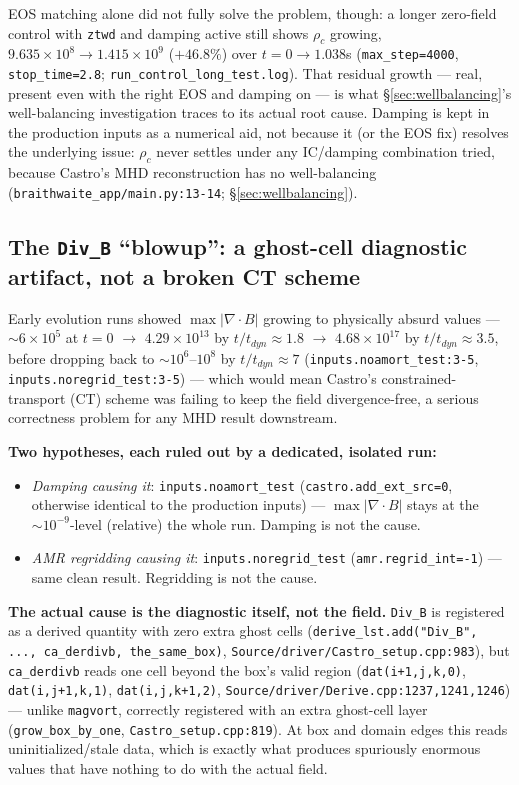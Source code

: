 \documentclass[11pt,a4paper]{scrartcl}
\newcommand{\code}[1]{\texttt{\small #1}}
\begin{document}
EOS matching alone did not fully solve the problem, though: a longer
zero-field control with \code{ztwd} and damping active still shows
$\rho_c$ growing, $9.635\times10^8\to1.415\times10^9$ ($+46.8\%$) over
$t=0\to1.038$s (\code{max\_step=4000}, \code{stop\_time=2.8};
\code{run\_control\_long\_test.log}). That residual growth --- real,
present even with the right EOS and damping on --- is what
\S\ref{sec:wellbalancing}'s well-balancing investigation traces to its
actual root cause. Damping is kept in the production inputs as a
numerical aid, not because it (or the EOS fix) resolves the underlying
issue: $\rho_c$ never settles under any IC/damping combination tried,
because Castro's MHD reconstruction has no well-balancing
(\code{braithwaite\_app/main.py:13-14}; \S\ref{sec:wellbalancing}).

\subsection{The \texorpdfstring{\code{Div\_B}}{Div\_B} ``blowup'': a ghost-cell diagnostic artifact, not a broken CT scheme}
\label{sec:divb-artifact}

Early evolution runs showed $\max|\nabla\cdot B|$ growing to physically
absurd values --- $\sim6\times10^5$ at $t=0$ $\to$ $4.29\times10^{13}$
by $t/t_{dyn}\approx1.8$ $\to$ $4.68\times10^{17}$ by
$t/t_{dyn}\approx3.5$, before dropping back to $\sim10^6$--$10^8$ by
$t/t_{dyn}\approx7$ (\code{inputs.noamort\_test:3-5},
\code{inputs.noregrid\_test:3-5}) --- which would mean Castro's
constrained-transport (CT) scheme was failing to keep the field
divergence-free, a serious correctness problem for any MHD result
downstream.

\textbf{Two hypotheses, each ruled out by a dedicated, isolated run:}
\begin{itemize}[leftmargin=1.4em,itemsep=0.2em]
\item \emph{Damping causing it}: \code{inputs.noamort\_test}
  (\code{castro.add\_ext\_src=0}, otherwise identical to the production
  inputs) --- $\max|\nabla\cdot B|$ stays at the $\sim10^{-9}$-level
  (relative) the whole run. Damping is not the cause.
\item \emph{AMR regridding causing it}: \code{inputs.noregrid\_test}
  (\code{amr.regrid\_int=-1}) --- same clean result. Regridding is not
  the cause.
\end{itemize}

\textbf{The actual cause is the diagnostic itself, not the field.}
\code{Div\_B} is registered as a derived quantity with zero extra ghost
cells (\code{derive\_lst.add("Div\_B", ..., ca\_derdivb, the\_same\_box)},
\code{Source/driver/Castro\_setup.cpp:983}), but \code{ca\_derdivb}
reads one cell beyond the box's valid region (\code{dat(i+1,j,k,0)},
\code{dat(i,j+1,k,1)}, \code{dat(i,j,k+1,2)},
\code{Source/driver/Derive.cpp:1237,1241,1246}) --- unlike
\code{magvort}, correctly registered with an extra ghost-cell layer
(\code{grow\_box\_by\_one}, \code{Castro\_setup.cpp:819}). At box and
domain edges this reads uninitialized/stale data, which is exactly what
produces spuriously enormous values that have nothing to do with the
actual field.
\end{document}

